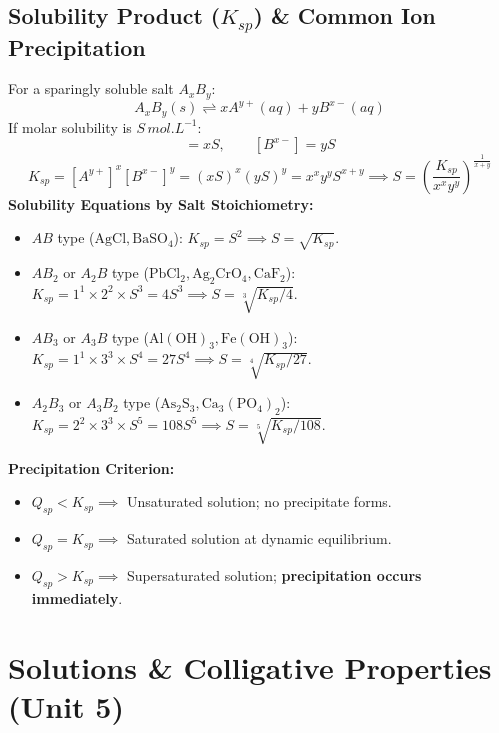 \documentclass[10pt,a4paper]{article}
\begin{document}
\subsection{Solubility Product ($K_{sp}$) \& Common Ion Precipitation}
For a sparingly soluble salt $A_x B_y$:
\begin{equation}
  A_x B_y(s) \rightleftharpoons x A^{y+}(aq) + y B^{x-}(aq)
\end{equation}
If molar solubility is $S\,\si{mol.L^{-1}}$:
\begin{equation}
  [A^{y+}] = x S, \qquad [B^{x-}] = y S
\end{equation}
\begin{equation}
  K_{sp} = [A^{y+}]^x [B^{x-}]^y = (x S)^x (y S)^y = x^x y^y S^{x+y} \implies S = \left(\frac{K_{sp}}{x^x y^y}\right)^{\frac{1}{x+y}}
\end{equation}
\textbf{Solubility Equations by Salt Stoichiometry:}
\begin{itemize}
  \item $AB$ type ($\mathrm{AgCl, BaSO_4}$): $K_{sp} = S^2 \implies S = \sqrt{K_{sp}}$.
  \item $AB_2$ or $A_2B$ type ($\mathrm{PbCl_2, Ag_2CrO_4, CaF_2}$): $K_{sp} = 1^1 \times 2^2 \times S^3 = 4S^3 \implies S = \sqrt[3]{K_{sp}/4}$.
  \item $AB_3$ or $A_3B$ type ($\mathrm{Al(OH)_3, Fe(OH)_3}$): $K_{sp} = 1^1 \times 3^3 \times S^4 = 27S^4 \implies S = \sqrt[4]{K_{sp}/27}$.
  \item $A_2B_3$ or $A_3B_2$ type ($\mathrm{As_2S_3, Ca_3(PO_4)_2}$): $K_{sp} = 2^2 \times 3^3 \times S^5 = 108S^5 \implies S = \sqrt[5]{K_{sp}/108}$.
\end{itemize}
\textbf{Precipitation Criterion:}
\begin{itemize}
  \item $Q_{sp} < K_{sp} \implies$ Unsaturated solution; no precipitate forms.
  \item $Q_{sp} = K_{sp} \implies$ Saturated solution at dynamic equilibrium.
  \item $Q_{sp} > K_{sp} \implies$ Supersaturated solution; \textbf{precipitation occurs immediately}.
\end{itemize}

\section{Solutions \& Colligative Properties (Unit 5)}
\end{document}
